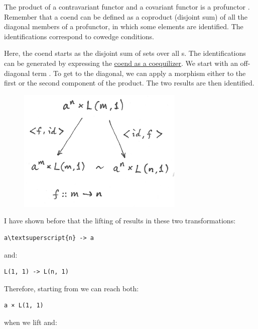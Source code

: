 The product of a contravariant functor  and a covariant
functor  is a profunctor
. Remember that a coend can be defined
as a coproduct (disjoint sum) of all the diagonal members of a
profunctor, in which some elements are identified. The identifications
correspond to cowedge conditions.

Here, the coend starts as the disjoint sum of sets
 over all s. The identifications can
be generated by expressing the
\hyperref[ends-and-coends]{coend as
a coequilizer}. We start with an off-diagonal term
. To get to the diagonal, we can apply a
morphism  either to the first or
the second component of the product. The two results are then
identified.

\begin{figure}[H]
\centering
\includegraphics[width=3.12500in]{images/equalize1.png}
\end{figure}

\noindent
I have shown before that the lifting of
 results in these two
transformations:

\begin{Verbatim}[commandchars=\\\{\}]
a\textsuperscript{n} -> a
\end{Verbatim}
and:

\begin{Verbatim}[commandchars=\\\{\}]
L(1, 1) -> L(n, 1)
\end{Verbatim}
Therefore, starting from  we can reach both:

\begin{Verbatim}[commandchars=\\\{\}]
a × L(1, 1)
\end{Verbatim}
when we lift  and:

